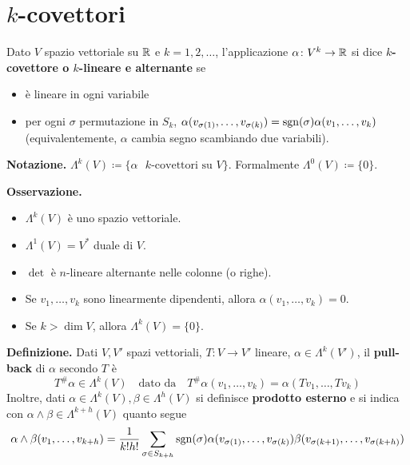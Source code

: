 \section{$k$-covettori}

Dato $V$ spazio vettoriale su $\mathbb R$ e $k=1,2,\ldots$, l'applicazione $\alpha \colon  V^k \to \mathbb R$ si dice \textbf{$k$-covettore o $k$-lineare e alternante} se
\begin{itemize}

	\item è lineare in ogni variabile

	\item per ogni $\sigma$ permutazione in $S_k$, $\alpha(v_{\sigma(1)},\ldots,v_{\sigma(k)}) = \operatorname{sgn}(\sigma) \alpha(v_1,\ldots,v_k)$ (equivalentemente, $\alpha$ cambia segno scambiando due variabili).

\end{itemize}

\textbf{Notazione.} $\Lambda^k (V) \coloneqq  \{\alpha \text{ $k$-covettori su } V \}$. Formalmente $\Lambda^0(V) \coloneqq \{0\}$.

\textbf{Osservazione.} 
\begin{itemize}

	\item $\Lambda^k(V)$ è uno spazio vettoriale. 

	\item $\Lambda^1(V) = V^*$ duale di $V$.

	\item $\det$ è $n$-lineare alternante nelle colonne (o righe).

	\item Se $v_1,\ldots,v_k$ sono linearmente dipendenti, allora $\alpha(v_1,\ldots,v_k) = 0$.

	\item Se $k > \dim V$, allora $\Lambda^k(V) = \{0\}$.

\end{itemize}

\textbf{Definizione.} Dati $V,V'$ spazi vettoriali, $T \colon V \to V'$ lineare, $\alpha \in \Lambda^k (V')$, il \textbf{pull-back} di $\alpha$ secondo $T$ è
%
$$
T^\# \alpha \in \Lambda^k(V) \quad \text{dato da} \quad T^\# \alpha(v_1,\ldots,v_k) = \alpha(Tv_1,\ldots,Tv_k)
$$
%
Inoltre, dati $\alpha \in \Lambda^k(V), \beta \in \Lambda^h(V)$ si definisce \textbf{prodotto esterno} e si indica con $\alpha \wedge \beta \in \Lambda^{k+h}(V)$ quanto segue
%
$$
	\alpha \wedge \beta (v_1,\ldots,v_{k+h}) = \frac{1}{k!h!} \sum_{\sigma \in S_{k+h}} \operatorname{sgn} (\sigma) \alpha(v_{\sigma(1)},\ldots,v_{\sigma(k)}) \beta(v_{\sigma(k+1)},\ldots,v_{\sigma(k+h)})
$$
%
